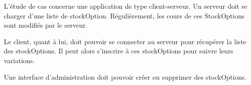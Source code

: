 L'étude de cas concerne une application de type client-serveur. Un serveur doit se charger d'une liste de stockOption. Régulièrement, les cours de ces StockOptions sont modifiés par le serveur. 

Le client, quant à lui, doit pouvoir se connecter au serveur pour récupérer la liste des stockOptions. Il peut alors s'inscrire à ces stockOptions pour suivre leurs variations. 

Une interface d'administration doit pouvoir créer ou supprimer des stockOptions.